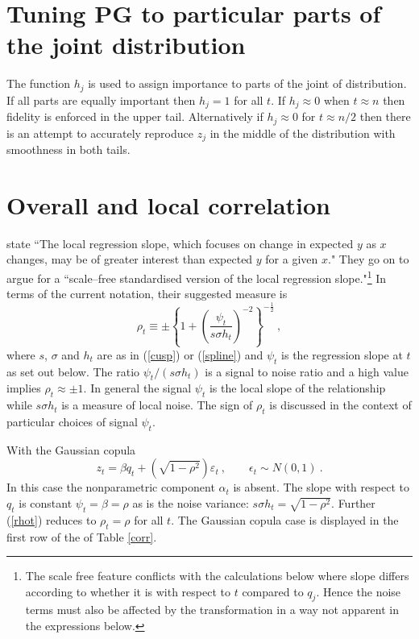 \documentclass[authoryear]{elsarticle}
\newcommand{\eps}{\epsilon}
\newcommand{\eref}[1]{(\ref{#1})}
\newcommand{\tref}[1]{Table \ref{#1}}
\newcommand{\cq}{\ , \qquad}
\newcommand{\be}[1]{\begin{equation}\label{#1}}
\newcommand{\ee}{\end{equation}}
\begin{document}
\section{Tuning PG to particular parts of the joint distribution}
The function $h_j$ is used to assign  importance to parts of the joint of distribution.  If all parts are equally important then $h_j=1$ for all $t$.   If $h_j\approx 0$ when $t\approx n$ then fidelity  is enforced in the upper tail.  Alternatively if $h_j\approx 0$ for $t\approx n/2$ then there is an attempt to accurately reproduce $z_j$ in the middle of the distribution with smoothness  in both tails.
\section{Overall and local correlation}

\cite{bjerve1993correlation} state ``The local regression slope, which focuses on change in expected $y$ as $x$ changes, may be of greater interest than expected  $y$ for a given $x$." They go on to argue for  a  ``scale--free standardised version of the local regression slope."\footnote{The scale free feature conflicts with the calculations below where  slope differs according to whether it is with respect to $t$ compared to $q_j$.  Hence the noise terms must also be affected by the transformation in a way not apparent in the expressions below.} In terms of the current notation, their suggested measure is 
\be{rhot}
 \rho_t\equiv\pm\left\{1+\left(\frac{\psi_t}{s\sigma h_t}\right)^{-2}\right\}^{-\frac{1}{2}}\ ,
\ee
where $s$, $\sigma$ and $h_t$ are as in \eref{cusp} or \eref{spline} and $\psi_t$ is the regression slope at $t$ as set out below.  The ratio $\psi_t/(s\sigma h_t)$ is a signal to noise ratio and a high value implies $\rho_t\approx \pm 1$.    In general the signal  $\psi_t$ is the local slope of the relationship while $s\sigma h_t$ is a measure of local noise.   The sign of $\rho_t$ is discussed in the context of particular choices of signal $\psi_t$.  

With the Gaussian copula 
$$
z_t=\beta q_t + (\sqrt{1-\rho^2})\varepsilon_t\cq \eps_t\sim N(0,1)\ .
$$
In this  case the nonparametric component $\alpha_t$ is absent.  The slope with respect to $q_t$ is constant $\psi_t=\beta=\rho$ as is the noise variance: $s\sigma h_t=\sqrt{1-\rho^2}$.  Further  \eref{rhot} reduces to $\rho_t=\rho$ for all $t$.  The Gaussian copula case is displayed in the first row of the of \tref{corr}.
\end{document}
